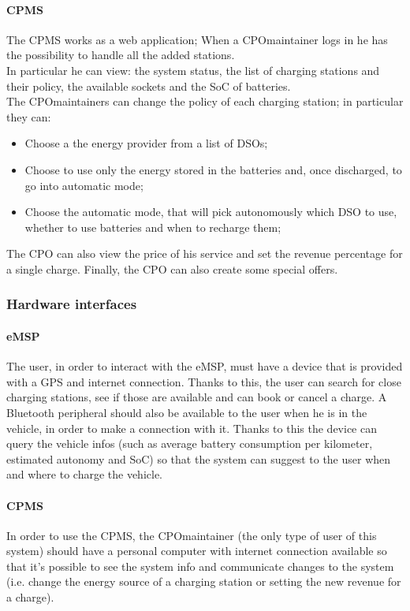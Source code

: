 \paragraph{\ac{CPMS}}
The \ac{CPMS} works as a web application; When a \ac{CPO}maintainer logs in he has the possibility to handle all the added stations.\\
In particular he can view: the system status, the list of charging stations and their policy, the available sockets and the \ac{SoC} of batteries.\\
The \ac{CPO}maintainers can change the policy of each charging station; in particular they can:
\begin{itemize}
    \item Choose a the energy provider from a list of \acp{DSO};
    \item Choose to use only the energy stored in the batteries and, once discharged, to go into automatic mode;
    \item Choose the automatic mode, that will pick autonomously which \ac{DSO} to use, whether to use batteries and when to recharge them;
\end{itemize}

The \ac{CPO} can also view the price of his service and set the revenue percentage for a single charge. Finally, the \ac{CPO} can also create some special offers.

\subsubsection{Hardware interfaces}
\paragraph{\ac{eMSP}}
The user, in order to interact with the \ac{eMSP}, must have a device that is provided with a \ac{GPS} and internet connection. Thanks to this, the user can search for close charging stations, see if those are available and can book or cancel a charge.
A Bluetooth peripheral should also be available to the user when he is in the vehicle, in order to make a connection with it. Thanks to this the device can query the vehicle infos (such as average battery consumption per kilometer, estimated autonomy and \ac{SoC}) so that the system can suggest to the user when and where to charge the vehicle.

\paragraph{\ac{CPMS}}
In order to use the \ac{CPMS}, the \ac{CPO}maintainer (the only type of user of this system) should have a personal computer with internet connection available so that it's possible to see the system info and communicate changes to the system (i.e. change the energy source of a charging station or setting the new revenue for a charge).

